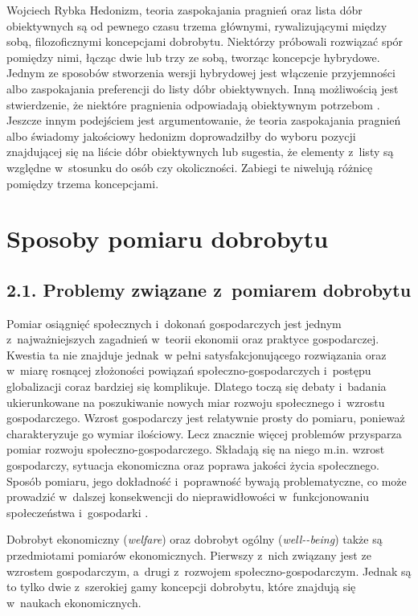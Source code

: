 \begin{artplenv}{Wojciech Rybka}
Hedonizm, teoria zaspokajania pragnień oraz lista dóbr obiektywnych są od pewnego czasu trzema głównymi, rywalizującymi
między sobą, filozoficznymi koncepcjami dobrobytu. Niektórzy próbowali rozwiązać spór pomiędzy nimi, łącząc dwie lub
trzy ze sobą, tworząc koncepcje hybrydowe. Jednym ze sposobów stworzenia wersji hybrydowej jest włączenie przyjemności
albo zaspokajania preferencji do listy dóbr obiektywnych. Inną możliwością jest stwierdzenie, że niektóre pragnienia
odpowiadają obiektywnym potrzebom
\parencite{hamilton_political_2003}.
Jeszcze innym podejściem jest
argumentowanie, że teoria zaspokajania pragnień albo świadomy jakościowy hedonizm doprowadziłby do wyboru pozycji
znajdującej się na liście dóbr obiektywnych lub sugestia, że elementy z~listy są względne w~stosunku do osób czy
okoliczności. Zabiegi te niwelują różnicę pomiędzy trzema koncepcjami.

\section{Sposoby pomiaru dobrobytu}
\baselineskip
\subsection{2.1. Problemy związane z~pomiarem dobrobytu}
Pomiar osiągnięć społecznych i~dokonań gospodarczych jest jednym z~najważniejszych zagadnień w~teorii ekonomii oraz
praktyce gospodarczej. Kwestia ta nie znajduje jednak~w pełni satysfakcjonującego rozwiązania oraz w~miarę rosnącej
złożoności powiązań społeczno-gospodarczych i~postępu globalizacji coraz bardziej się komplikuje. Dlatego toczą się
debaty  i~badania ukierunkowane na poszukiwanie nowych miar rozwoju społecznego i~wzrostu gospodarczego. Wzrost
gospodarczy jest relatywnie prosty do pomiaru, ponieważ charakteryzuje go wymiar ilościowy. Lecz znacznie więcej
problemów przysparza pomiar rozwoju społeczno-gospodarczego. Składają się na niego m.in. wzrost gospodarczy, sytuacja
ekonomiczna oraz poprawa jakości życia społecznego. Sposób pomiaru, jego dokładność i~poprawność bywają problematyczne,
co może prowadzić w~dalszej konsekwencji do nieprawidłowości w~funkcjonowaniu społeczeństwa i~gospodarki
\parencite{cieslik_dylemat_2014}.

Dobrobyt ekonomiczny (\textit{welfare}) oraz dobrobyt ogólny (\textit{well-\mbox{-being}}) także są przedmiotami pomiarów
ekonomicznych. Pierwszy z~nich związany jest ze wzrostem gospodarczym, a~drugi z~rozwojem społeczno-gospodarczym.
Jednak są to tylko dwie z~szerokiej gamy koncepcji dobrobytu, które znajdują się w~naukach ekonomicznych.


\end{artplenv}
